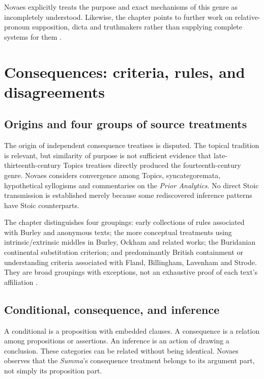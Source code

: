 Novaes explicitly treats the purpose and exact mechanisms of this genre
as incompletely understood. Likewise, the chapter points to further
work on relative-pronoun supposition, dicta and truthmakers rather than
supplying complete systems for them
\cite[pp.~466--467]{DutilhNovaes2007FordhamChapter8}.

\section{Consequences: criteria, rules, and disagreements}
\label{sec:p13-latin-consequences}

\subsection{Origins and four groups of source treatments}

The origin of independent consequence treatises is disputed.
The topical tradition is relevant, but similarity of purpose is not
sufficient evidence that late-thirteenth-century Topics treatises directly
produced the fourteenth-century genre. Novaes considers convergence among
Topics, syncategoremata, hypothetical syllogisms and commentaries on the
\emph{Prior Analytics}. No direct Stoic transmission is established merely
because some rediscovered inference patterns have Stoic counterparts.

The chapter distinguishes four groupings: early collections of rules
associated with Burley and anonymous texts; the more conceptual treatments
using intrinsic/extrinsic middles in Burley, Ockham and related works;
the Buridanian continental substitution criterion; and predominantly British
containment or understanding criteria associated with Fland, Billingham,
Lavenham and Strode. They are broad groupings with exceptions, not an
exhaustive proof of each text's affiliation
\cite[pp.~468--471]{DutilhNovaes2007FordhamChapter8}.

\subsection{Conditional, consequence, and inference}

A conditional is a proposition with embedded clauses. A consequence is
a relation among propositions or assertions. An inference is an action
of drawing a conclusion. These categories can be related without being
identical. Novaes observes that the \emph{Summa}'s consequence treatment
belongs to its argument part, not simply its proposition part.

